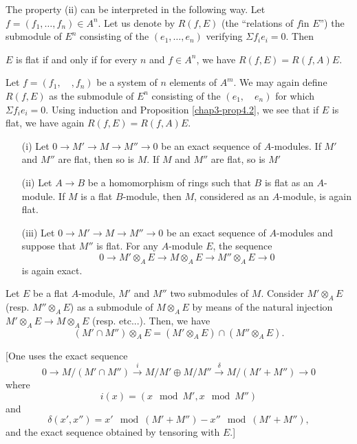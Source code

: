 The property (ii) can be interpreted in the following way. Let $f=(f_{1},\ldots,f_{n})\in A^{n}$. Let us denote by $R(f,E)$ (the ``relations of $f$\pageoriginale in $E$'') the submodule of $E^{n}$ consisting of the $(e_{1},\ldots,e_{n})$ verifying $\Sigma f_{i}e_{i}=0$. Then

\begin{proposition}\label{chap3-prop4.2}
$E$ is flat if and only if for every $n$ and $f\in A^{n}$, we have $R(f,E)=R(f,A)E$.
\end{proposition}

\begin{remark}\label{chap3-rem4.3}
Let $f=(f_{1},\quad,f_{n})$ be a system of $n$ elements of $A^{m}$. We may again define $R(f,E)$ as the submodule of $E^{n}$ consisting of the $(e_{1},\quad e_{n})$ for which $\Sigma f_{i}e_{i}=0$. Using induction and Proposition \ref{chap3-prop4.2}, we see that if $E$ is flat, we have again $R(f,E)=R(f,A)E$.
\end{remark}

\begin{proposition}\label{chap3-prop4.4}
\begin{itemize}
\item[\rm(i)] Let $0\to M'\to M\to M''\to 0$ be an exact sequence of $A$-modules. If $M'$ and $M''$ are flat, then so is $M$. If $M$ and $M''$ are flat, so is $M'$

\item[\rm(ii)] Let $A\to B$ be a homomorphism of rings such that $B$ is flat as an $A$-module. If $M$ is a flat $B$-module, then $M$, considered as an $A$-module, is again flat.

\item[\rm(iii)] Let $0\to M'\to M\to M''\to 0$ be an exact sequence of $A$-modules and suppose that $M''$ is flat. For any $A$-module $E$, the sequence
$$
0\to M'\otimes_{A}E\to M\otimes_{A}E\to M''\otimes_{A}E\to 0
$$
is again exact.
\end{itemize}
\end{proposition}

\begin{proposition}\label{chap3-prop4.5}
Let $E$ be a flat $A$-module, $M'$ and $M''$ two submodules of $M$. Consider $M'\otimes_{A}E$ (resp. $M''\otimes_{A}E$) as a submodule of $M\otimes_{A}E$ by means of the natural injection $M'\otimes_{A}E\to M\otimes_{A}E$ (resp. etc...). Then, we have
$$
(M'\cap M'')\otimes_{A}E=(M'\otimes_{A}E)\cap (M''\otimes_{A}E).
$$
\end{proposition}
[One uses the exact sequence
$$
0\to M/(M'\cap M'')\xrightarrow{i}M/M'\oplus M/M''\xrightarrow{\delta}M/(M'+M'')\to 0
$$
where
$$
i(x)=(x\mod M',x\mod M'')
$$
and
$$
\delta(x',x'')=x'\mod (M'+M'')-x''\mod (M'+M''),
$$
and the exact sequence obtained by tensoring with $E$.]

